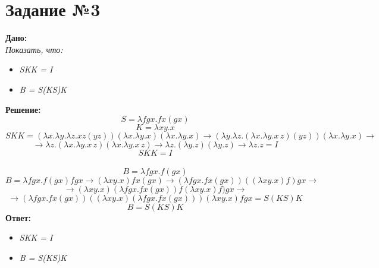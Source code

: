 \documentclass[a4paper,portrait,12pt]{article}
\begin{document}
\section*{Задание №3}
\textbf{Дано:}\\
\textit{Показать, что:}
\begin{itemize}
\item \textit{SKK = I}
\item \textit{B = S(KS)K}
\end{itemize}
\textbf{Решение:}
\[S = {\lambda}fgx.fx(gx)\]
\[K = {\lambda}xy.x\]
\[SKK = ({\lambda} x.{\lambda} y.{\lambda} z.xz(yz))({\lambda} x.{\lambda} y.x)({\lambda} x.{\lambda} y.x) \to({\lambda} y.{\lambda} z.({\lambda} x.{\lambda} y.x \, z)(yz))({\lambda} x.{\lambda} y.x) \to \]
 \[  \to {\lambda} z.({\lambda} x.{\lambda} y.x \, z)({\lambda} x.{\lambda} y.x \, z) \to {\lambda} z.({\lambda} y.z)({\lambda} y.z)  \to {\lambda} z.z = I\]
\textbf{\[SKK = I\]}\\
\[B = {\lambda}fgx.f(gx)\]
\[B = {\lambda}fgx.f(gx)fgx \to ({\lambda}xy.x)fx(gx) \to ({\lambda}fgx.fx(gx))(({\lambda}xy.x)f)gx \to \] \[ \to({\lambda}xy.x)({\lambda}fgx.fx(gx))f({\lambda}xy.x)f)gx \to \] \[ \to ({\lambda}fgx.fx(gx))(({\lambda}xy.x)({\lambda}fgx.fx(gx)))({\lambda}xy.x)fgx = S(KS)K \]
\textbf{\[B = S(KS)K\]}
\textbf{Ответ:}
\begin{itemize}
\item \textit{SKK = I}
\item \textit{B = S(KS)K}
\end{itemize}
\end{document}
